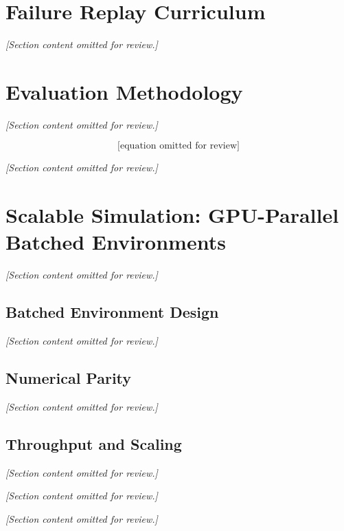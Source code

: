 \section{Failure Replay Curriculum}
\label{sec:failure_replay}
\textit{[Section content omitted for review.]}

\section{Evaluation Methodology}
\label{sec:eval_methodology}
\textit{[Section content omitted for review.]}

\begin{equation}
\text{[equation omitted for review]}
\label{eq:attempt_ev}
\end{equation}

\textit{[Section content omitted for review.]}

\section{Scalable Simulation: GPU-Parallel Batched Environments}
\label{sec:batched_sim}
\textit{[Section content omitted for review.]}

\subsection{Batched Environment Design}
\textit{[Section content omitted for review.]}

\subsection{Numerical Parity}
\textit{[Section content omitted for review.]}

\subsection{Throughput and Scaling}
\textit{[Section content omitted for review.]}

\begin{table}[H]
\centering
\caption{Environment-stepping throughput (transitions per second) for the batched GPU environment versus the single-core scalar reference, measured on an RTX 4080 SUPER.}
\label{tab:sim_throughput}
\end{table}

\textit{[Section content omitted for review.]}

\begin{table}[H]
\centering
\caption{Same batched code, NumPy (CPU) versus CuPy (GPU), by batch size $N$ and observation type. Throughput in transitions per second; speedup is CuPy relative to NumPy.}
\label{tab:numpy_cupy}
\end{table}

\textit{[Section content omitted for review.]}

